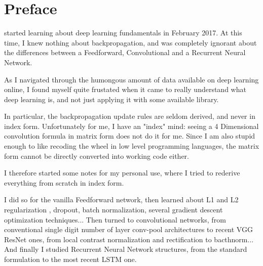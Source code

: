 \chapter{Preface}

 started learning about deep learning fundamentals in February 2017. At this time, I knew nothing about backpropagation, and was completely ignorant about the differences between a Feedforward, Convolutional and a Recurrent Neural Network.

\vspace{0.2cm}

As I navigated through the humongous amount of data available on deep learning online, I found myself quite frustated when it came to really understand what deep learning is, and not just applying it with some available library. 

\vspace{0.2cm}

In particular, the backpropagation update rules are seldom derived, and never in index form. Unfortunately for me, I have an "index" mind: seeing a 4 Dimensional convolution formula in matrix form does not do it for me. Since I am also stupid enough to like recoding the wheel in low level programming languages, the matrix form cannot be directly converted into working code either. 


\vspace{0.2cm}

I therefore started some notes for my personal use, where I tried to rederive everything from scratch in index form.

\vspace{0.2cm}

I did so for the vanilla Feedforward network, then learned about L1 and L2 regularization , dropout\cite{Srivastava:2014:DSW:2627435.2670313}, batch normalization\cite{Ioffe2015}, several gradient descent optimization techniques... Then turned to convolutional networks, from conventional single digit number of layer conv-pool architectures\cite{Lecun98gradient-basedlearning} to recent VGG\cite{DBLP:journals/corr/SimonyanZ14a} ResNet\cite{He2015} ones, from local contrast normalization and rectification to bacthnorm... And finally I studied Recurrent Neural Network structures\cite{GravesA2016}, from the standard formulation to the most recent LSTM one\cite{Gers:2000:LFC:1121912.1121915}.

\vspace{0.2cm}

